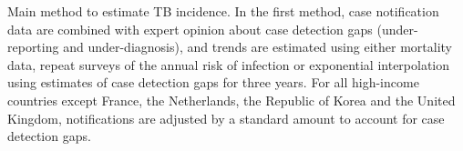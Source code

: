 \label{fig:incmethods}Main method to estimate TB incidence. In the first method, case notification data are combined with expert opinion about case detection gaps (under-reporting and under-diagnosis), and trends are estimated using either mortality data, repeat surveys of the annual risk of infection or exponential interpolation using estimates of case detection gaps for three years. For all high-income countries except France, the Netherlands, the Republic of Korea and the United Kingdom, notifications are adjusted by a standard amount to account for case detection gaps. 